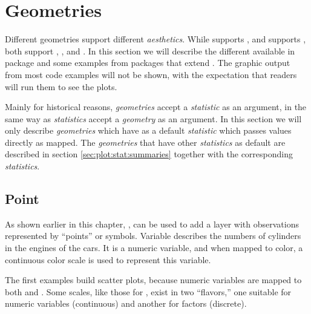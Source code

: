 \documentclass[krantz2]{krantz}\usepackage{knitr}
\begin{document}
\section{Geometries}\label{sec:plot:geometries}

Different geometries support different \emph{aesthetics}. While  supports , and  supports , both support , ,  and . In this section we will describe the different  available in package \ggplot and some examples from packages that extend \ggplot. The graphic output from most code examples will not be shown, with the expectation that readers will run them to see the plots.

Mainly for historical reasons, \emph{geometries} accept a \emph{statistic} as an argument, in the same way as \emph{statistics} accept a \emph{geometry} as an argument. In this section we will only describe \emph{geometries} which have as a default \emph{statistic}  which passes values directly as mapped. The \emph{geometries} that have other \emph{statistics} as default are described in section \ref{sec:plot:stat:summaries} together with the corresponding \emph{statistics}.

\subsection{Point}\label{sec:plot:geom:point}

As shown earlier in this chapter, , can be used to add a layer with observations represented by ``points'' or symbols. Variable  describes the numbers of cylinders in the engines of the cars. It is a numeric variable, and when mapped to color, a continuous color scale is used to represent this variable.

The first examples build scatter plots, because numeric variables are mapped to both  and .
Some scales, like those for , exist in two ``flavors,'' one suitable for numeric variables (continuous) and another for factors (discrete).
\end{document}
